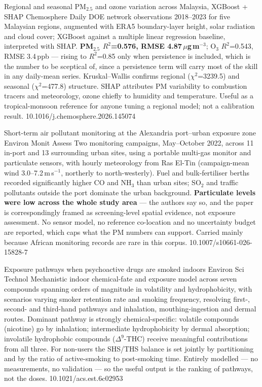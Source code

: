 \documentclass[10pt]{article}
\begin{document}
{Regional and seasonal PM$_{2.5}$ and ozone variation across Malaysia, XGBoost + SHAP}
{Chemosphere}
{Daily DOE network observations 2018--2023 for five Malaysian regions, augmented with
ERA5 boundary-layer height, solar radiation and cloud cover; XGBoost against a multiple
linear regression baseline, interpreted with SHAP. \textbf{PM$_{2.5}$ $R^2$=0.576,
RMSE 4.87\,$\mu$g\,m$^{-3}$}; O$_3$ $R^2$=0.543, RMSE 3.4\,ppb --- rising to $R^2$=0.85
only when persistence is included, which is the number to be sceptical of, since a
persistence term will carry most of the skill in any daily-mean series. Kruskal--Wallis
confirms regional ($\chi^2$=3239.5) and seasonal ($\chi^2$=477.8) structure. SHAP
attributes PM variability to combustion tracers and meteorology, ozone chiefly to
humidity and temperature. Useful as a tropical-monsoon reference for anyone tuning a
regional model; not a calibration result.}
{10.1016/j.chemosphere.2026.145074}

{Short-term air pollutant monitoring at the Alexandria port--urban exposure zone}
{Environ Monit Assess}
{Two monitoring campaigns, May--October 2022, across 11 in-port and 13 surrounding urban
sites, using a portable multi-gas monitor and particulate sensors, with hourly
meteorology from Ras El-Tin (campaign-mean wind 3.0--7.2\,m\,s$^{-1}$, northerly to
north-westerly). Fuel and bulk-fertiliser berths recorded significantly higher CO and
NH$_3$ than urban sites; SO$_2$ and traffic pollutants outside the port dominate the
urban background. \textbf{Particulate levels were low across the whole study area} ---
the authors say so, and the paper is correspondingly framed as screening-level spatial
evidence, not exposure assessment. No sensor model, no reference co-location and no
uncertainty budget are reported, which caps what the PM numbers can support. Carried
mainly because African monitoring records are rare in this corpus.}
{10.1007/s10661-026-15828-7}


{Exposure pathways when psychoactive drugs are smoked indoors}
{Environ Sci Technol}
{Mechanistic indoor chemical-fate and exposure model across seven compounds spanning
orders of magnitude in volatility and hydrophobicity, with scenarios varying smoker
retention rate and smoking frequency, resolving first-, second- and third-hand pathways
and inhalation, mouthing-ingestion and dermal routes. Dominant pathway is strongly
chemical-specific: volatile compounds (nicotine) go by inhalation; intermediate
hydrophobicity by dermal absorption; involatile hydrophobic compounds
($\Delta^9$-THC) receive meaningful contributions from all three. For non-users the
SHS/THS balance is set jointly by partitioning and by the ratio of active-smoking to
post-smoking time. Entirely modelled --- no measurements, no validation --- so the
useful output is the ranking of pathways, not the doses.}
{10.1021/acs.est.6c02953}
\end{document}

